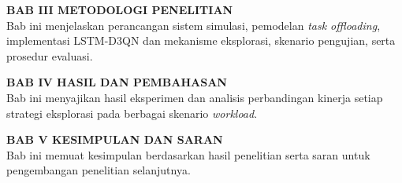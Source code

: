 \vspace{0.5em}
\noindent\textbf{BAB III METODOLOGI PENELITIAN}\\
Bab ini menjelaskan perancangan sistem simulasi, pemodelan \textit{task offloading}, implementasi LSTM-D3QN dan mekanisme eksplorasi, skenario pengujian, serta prosedur evaluasi.

\vspace{0.5em}
\noindent\textbf{BAB IV HASIL DAN PEMBAHASAN}\\
Bab ini menyajikan hasil eksperimen dan analisis perbandingan kinerja setiap strategi eksplorasi pada berbagai skenario \textit{workload}.

\vspace{0.5em}
\noindent\textbf{BAB V KESIMPULAN DAN SARAN}\\
Bab ini memuat kesimpulan berdasarkan hasil penelitian serta saran untuk pengembangan penelitian selanjutnya.

